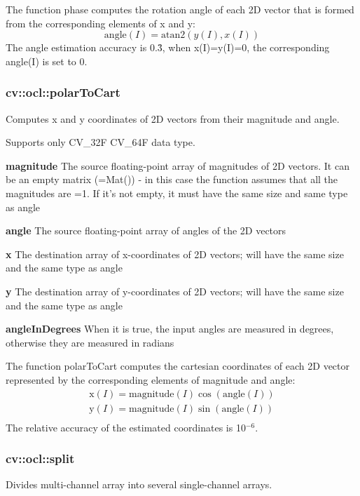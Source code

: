 \documentclass{article}
\begin{document}
The function phase computes the rotation angle of each 2D vector that is
formed from the corresponding elements of x and y:
\[
\mbox{angle}\left( I \right)=\mbox{atan}2\left( {y\left( I \right),x\left( I
\right)} \right)
\]
The angle estimation accuracy is 0.3\r{ }, when x(I)=y(I)=0, the
corresponding angle(I) is set to 0.

\newpage

\subsubsection{cv::ocl::polarToCart }
\label{subsubsec:mylabel26}
Computes x and y coordinates of 2D vectors from their magnitude and angle.

Supports only CV{\_}32F CV{\_}64F data type.

\textbf{magnitude }The source floating-point array of magnitudes of 2D
vectors. It can be an empty matrix (=Mat()) - in this case the function
assumes that all the magnitudes are =1. If it's not empty, it must have the
same size and same type as angle

\textbf{angle }The source floating-point array of angles of the 2D vectors

\textbf{x }The destination array of x-coordinates of 2D vectors; will have
the same size and the same type as angle

\textbf{y }The destination array of y-coordinates of 2D vectors; will have
the same size and the same type as angle

\textbf{angleInDegrees }When it is true, the input angles are measured in
degrees, otherwise they are measured in radians

The function polarToCart computes the cartesian coordinates of each 2D
vector represented by the corresponding elements of magnitude and angle:
\[
\begin{array}{l}
 \mbox{x}\left( I \right)=\mbox{magnitude}\left( I \right)\cos \left(
{\mbox{angle}\left( I \right)} \right) \\
 \mbox{y}\left( I \right)=\mbox{magnitude}\left( I \right)\sin \left(
{\mbox{angle}\left( I \right)} \right) \\
 \end{array}
\]
The relative accuracy of the estimated coordinates is 10$^{-6}$.

\newpage

\subsubsection{cv::ocl::split }
\label{subsubsec:mylabel27}
Divides multi-channel array into several single-channel arrays.
\end{document}
